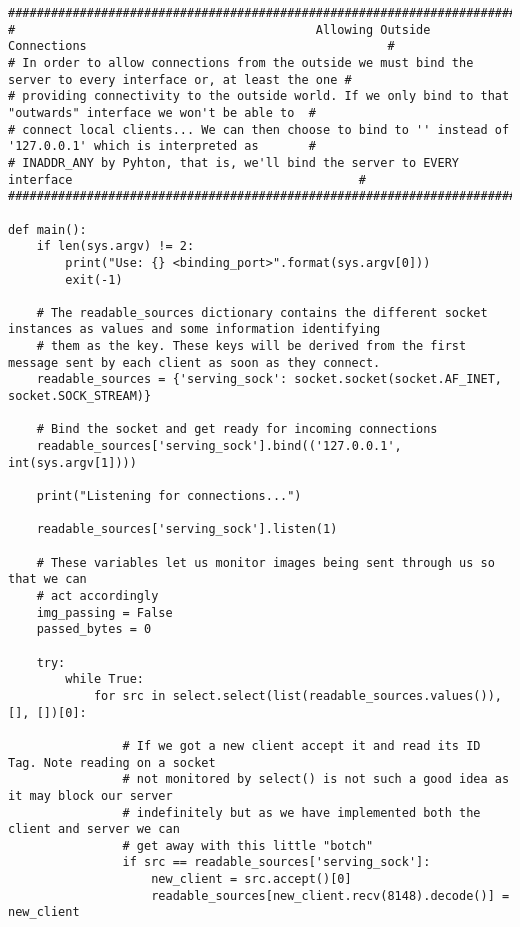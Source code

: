 \documentclass[landscape]{article}
\begin{document}
\begin{verbatim}
##################################################################################################################
#                                          Allowing Outside Connections                                          #
# In order to allow connections from the outside we must bind the server to every interface or, at least the one #
# providing connectivity to the outside world. If we only bind to that "outwards" interface we won't be able to  #
# connect local clients... We can then choose to bind to '' instead of '127.0.0.1' which is interpreted as       #
# INADDR_ANY by Pyhton, that is, we'll bind the server to EVERY interface                                        #
##################################################################################################################

def main():
    if len(sys.argv) != 2:
        print("Use: {} <binding_port>".format(sys.argv[0]))
        exit(-1)

    # The readable_sources dictionary contains the different socket instances as values and some information identifying
    # them as the key. These keys will be derived from the first message sent by each client as soon as they connect.
    readable_sources = {'serving_sock': socket.socket(socket.AF_INET, socket.SOCK_STREAM)}

    # Bind the socket and get ready for incoming connections
    readable_sources['serving_sock'].bind(('127.0.0.1', int(sys.argv[1])))

    print("Listening for connections...")

    readable_sources['serving_sock'].listen(1)

    # These variables let us monitor images being sent through us so that we can
    # act accordingly
    img_passing = False
    passed_bytes = 0

    try:
        while True:
            for src in select.select(list(readable_sources.values()), [], [])[0]:

                # If we got a new client accept it and read its ID Tag. Note reading on a socket
                # not monitored by select() is not such a good idea as it may block our server
                # indefinitely but as we have implemented both the client and server we can
                # get away with this little "botch"
                if src == readable_sources['serving_sock']:
                    new_client = src.accept()[0]
                    readable_sources[new_client.recv(8148).decode()] = new_client


\end{verbatim}
\end{document}
